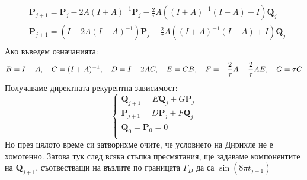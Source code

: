 \documentclass[12pt]{article}
\begin{document}
\begin{large}
\begin{align*}
&\mathbf{P}_{j + 1} = \mathbf{P}_j -2 A \left(I + A \right)^{-1} \mathbf{P}_j - \frac{2}{\tau} A \left(\left(I + A \right)^{-1} \left(I - A \right) + I \right) \mathbf{Q}_j \\
&\mathbf{P}_{j + 1} = \left(I -2 A \left(I + A \right)^{-1}\right) \mathbf{P}_j - \frac{2}{\tau} A \left(\left(I + A \right)^{-1} \left(I - A \right) + I \right) \mathbf{Q}_j \\
\end{align*}
Ако въведем означанията:
\begin{equation}
B = I - A, \quad C = (I + A)^{-1}, \quad D = I - 2 A C, \quad E = C B, \quad F = -\frac{2}{\tau} A - \frac{2}{\tau} A E, \quad G = \tau C \\  
\end{equation}
Получаваме директната рекурентна зависимост:
\begin{equation}
	\begin{cases}
      \mathbf{Q}_{j + 1} = E\mathbf{Q}_j + G\mathbf{P}_j \\
      \mathbf{P}_{j + 1} = D\mathbf{P}_j + F\mathbf{Q}_j \\
      \mathbf{Q}_0 = \mathbf{P}_0 = 0 \\
    \end{cases}
\end{equation}
Но през цялото време си затворихме очите, че условието на Дирихле не е хомогенно. Затова тук след всяка стъпка пресмятания, ще задаваме компонентите на $\mathbf{Q}_{j + 1}$, съотвестващи на възлите по границата $\Gamma_{D}$ да са $\sin(8\pi t_{j+1})$
\end{large}
\end{document}
